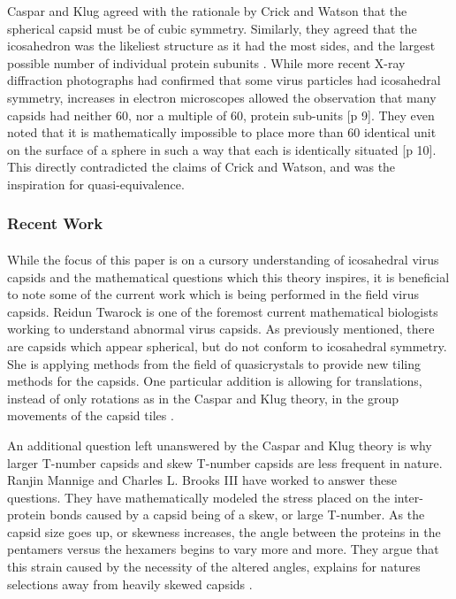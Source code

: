 \documentclass[12pt,letter]{article}
\begin{document}
Caspar and Klug agreed with the rationale by Crick and Watson that the spherical capsid must be of cubic symmetry. Similarly, they agreed that the icosahedron was the likeliest structure as it had the most sides, and the largest possible number of individual protein subunits \cite[p 7-8]{Caspar:1962}. While more recent X-ray diffraction photographs had confirmed that some virus particles had icosahedral symmetry, increases in electron microscopes allowed the observation that many capsids had neither 60, nor a multiple of 60, protein sub-units [p 9]. They even noted that it is mathematically impossible to place more than 60 identical unit on the surface of a sphere in such a way that each is identically situated [p 10]. This directly contradicted the claims of Crick and Watson, and was the inspiration for quasi-equivalence.


\subsubsection{Recent Work}
\paragraph{}
While the focus of this paper is on a cursory understanding of icosahedral virus capsids and the mathematical questions which this theory inspires, it is beneficial to note some of the current work which is being performed in the field virus capsids. Reidun Twarock is one of the foremost current mathematical biologists working to understand abnormal virus capsids. As previously mentioned, there are capsids which appear spherical, but do not conform to icosahedral symmetry. She is applying methods from the field of quasicrystals to provide new tiling methods for the capsids. One particular addition is allowing for translations, instead of only rotations as in the Caspar and Klug theory, in the group movements of the capsid tiles \cite{Twarock:2004} \cite{Twarock:2006}. 

An additional question left unanswered by the Caspar and Klug theory is why larger T-number capsids and skew T-number capsids are less frequent in nature. Ranjin Mannige and Charles L. Brooks III have worked to answer these questions. They have mathematically modeled the stress placed on the inter-protein bonds caused by a capsid being of a skew, or large T-number. As the capsid size goes up, or skewness increases, the angle between the proteins in the pentamers versus the hexamers begins to vary more and more. They argue that this strain caused by the necessity of the altered angles, explains for natures selections away from heavily skewed capsids \cite{Mannige:2009}.
\end{document}
